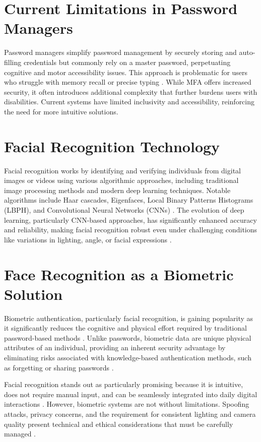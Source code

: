 \section{Current Limitations in Password Managers}
Password managers simplify password management by securely storing and auto-filling credentials but commonly rely on a master password, perpetuating cognitive and motor accessibility issues. This approach is problematic for users who struggle with memory recall or precise typing \autocite{IALabs2024}. While MFA offers increased security, it often introduces additional complexity that further burdens users with disabilities. Current systems have limited inclusivity and accessibility, reinforcing the need for more intuitive solutions.

\section{Facial Recognition Technology}
Facial recognition works by identifying and verifying individuals from digital images or videos using various algorithmic approaches, including traditional image processing methods and modern deep learning techniques. Notable algorithms include Haar cascades, Eigenfaces, Local Binary Patterns Histograms (LBPH), and Convolutional Neural Networks (CNNs) \autocite{ElSayed2015}. The evolution of deep learning, particularly CNN-based approaches, has significantly enhanced accuracy and reliability, making facial recognition robust even under challenging conditions like variations in lighting, angle, or facial expressions \autocite{ZhangDlib2020}.

\section{Face Recognition as a Biometric Solution}
Biometric authentication, particularly facial recognition, is gaining popularity as it significantly reduces the cognitive and physical effort required by traditional password-based methods \autocite{Furnell2022}. 
Unlike passwords, biometric data are unique physical attributes of an individual, providing an inherent security advantage by eliminating risks associated with knowledge-based authentication methods, 
such as forgetting or sharing passwords \autocite{Pant2022}.

Facial recognition stands out as particularly promising because it is intuitive, does not require manual input, and can be seamlessly integrated into daily digital interactions \autocite{Bhatt2011}. However, biometric systems are not without limitations. Spoofing attacks, privacy concerns, and the requirement for consistent lighting and camera quality present technical and ethical considerations that must be carefully managed \autocite{Kuznetsov2024, Bahia2024}.

